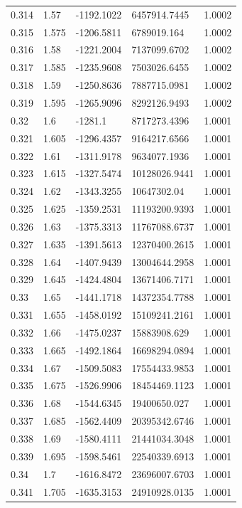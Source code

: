 \begin{tabular}{lllll}
0.314 & 1.57 & -1192.1022 & 6457914.7445 & 1.0002 \\
0.315 & 1.575 & -1206.5811 & 6789019.164 & 1.0002 \\
0.316 & 1.58 & -1221.2004 & 7137099.6702 & 1.0002 \\
0.317 & 1.585 & -1235.9608 & 7503026.6455 & 1.0002 \\
0.318 & 1.59 & -1250.8636 & 7887715.0981 & 1.0002 \\
0.319 & 1.595 & -1265.9096 & 8292126.9493 & 1.0002 \\
0.32 & 1.6 & -1281.1 & 8717273.4396 & 1.0001 \\
0.321 & 1.605 & -1296.4357 & 9164217.6566 & 1.0001 \\
0.322 & 1.61 & -1311.9178 & 9634077.1936 & 1.0001 \\
0.323 & 1.615 & -1327.5474 & 10128026.9441 & 1.0001 \\
0.324 & 1.62 & -1343.3255 & 10647302.04 & 1.0001 \\
0.325 & 1.625 & -1359.2531 & 11193200.9393 & 1.0001 \\
0.326 & 1.63 & -1375.3313 & 11767088.6737 & 1.0001 \\
0.327 & 1.635 & -1391.5613 & 12370400.2615 & 1.0001 \\
0.328 & 1.64 & -1407.9439 & 13004644.2958 & 1.0001 \\
0.329 & 1.645 & -1424.4804 & 13671406.7171 & 1.0001 \\
0.33 & 1.65 & -1441.1718 & 14372354.7788 & 1.0001 \\
0.331 & 1.655 & -1458.0192 & 15109241.2161 & 1.0001 \\
0.332 & 1.66 & -1475.0237 & 15883908.629 & 1.0001 \\
0.333 & 1.665 & -1492.1864 & 16698294.0894 & 1.0001 \\
0.334 & 1.67 & -1509.5083 & 17554433.9853 & 1.0001 \\
0.335 & 1.675 & -1526.9906 & 18454469.1123 & 1.0001 \\
0.336 & 1.68 & -1544.6345 & 19400650.027 & 1.0001 \\
0.337 & 1.685 & -1562.4409 & 20395342.6746 & 1.0001 \\
0.338 & 1.69 & -1580.4111 & 21441034.3048 & 1.0001 \\
0.339 & 1.695 & -1598.5461 & 22540339.6913 & 1.0001 \\
0.34 & 1.7 & -1616.8472 & 23696007.6703 & 1.0001 \\
0.341 & 1.705 & -1635.3153 & 24910928.0135 & 1.0001 \\

\end{tabular}

